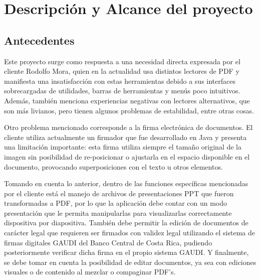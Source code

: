 \section{Descripción y Alcance del proyecto}
\subsection{Antecedentes}


Este proyecto surge como respuesta a una necesidad directa expresada por el cliente Rodolfo Mora, quien en la actualidad usa distintos lectores de PDF y manifiesta una insatisfacción con estas herramientas debido a sus interfaces sobrecargadas de utilidades, barras de herramientas y menús poco intuitivos. Además, también menciona experiencias negativas con lectores alternativos, que son más livianos, pero tienen algunos problemas de estabilidad, entre otras cosas.

Otro problema mencionado corresponde a la firma electrónica de documentos. El cliente utiliza actualmente un firmador que fue desarrollado en Java y presenta una limitación importante: esta firma utiliza siempre el tamaño original de la imagen sin posibilidad de re-posicionar o ajustarla en el espacio disponible en el documento, provocando superposiciones con el texto u otros elementos.

Tomando en cuenta lo anterior, dentro de las funciones específicas mencionadas por el cliente está el manejo de archivos de presentaciones PPT que fueron transformadas a PDF, por lo que la aplicación debe contar con un modo presentación que le permita manipularlas para visualizarlas correctamente dispositiva por diapositiva. También debe permitir la edición de documentos de carácter legal que requieren ser firmados con validez legal utilizando el sistema de firmas digitales GAUDI del Banco Central de Costa Rica, pudiendo posteriormente verificar dicha firma en el propio sistema GAUDI. Y finalmente, se debe tomar en cuenta la posibilidad de editar documentos, ya sea con ediciones visuales o de contenido al mezclar o compaginar PDF's.

